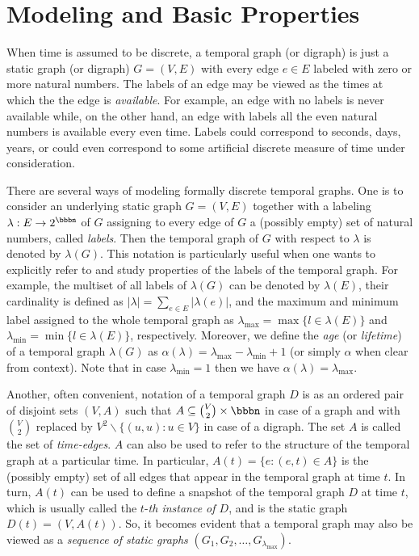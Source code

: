 \documentclass[oribibl, 11pt]{llncs}
\newcommand{\bs}{\backslash}
\begin{document}
\section{Modeling and Basic Properties}
\label{sec:model}

When time is assumed to be discrete, a temporal graph (or digraph) is just a static graph (or digraph) $G=(V,E)$ with every edge $e\in E$ labeled with zero or more natural numbers. The labels of an edge may be viewed as the times at which the the edge is \emph{available}. For example, an edge with no labels is never available while, on the other hand, an edge with labels all the even natural numbers is available every even time. Labels could correspond to seconds, days, years, or could even correspond to some artificial discrete measure of time under consideration. 

There are several ways of modeling formally discrete temporal graphs. One is to consider an underlying static graph $G=(V,E)$ together with a labeling $\lambda:E\rightarrow 2^\bbbn$ of $G$ assigning to every edge of $G$ a (possibly empty) set of natural numbers, called \emph{labels}. Then the temporal graph of $G$ with respect to $\lambda$ is denoted by $\lambda(G)$. This notation is particularly useful when one wants to explicitly refer to and study properties of the labels of the temporal graph. For example, the multiset of all labels of $\lambda(G)$ can be denoted by $\lambda(E)$, their cardinality is defined as $|\lambda|=\sum_{e\in E} |\lambda(e)|$, and the maximum and minimum label assigned to the whole temporal graph as $\lambda_{\max}= \max\{l\in \lambda(E)\}$ and $\lambda_{\min}= \min\{l\in \lambda(E)\}$, respectively. Moreover, we define the \emph{age} (or \emph{lifetime}) of a temporal graph $\lambda(G)$ as $\alpha(\lambda)= \lambda_{\max}-\lambda_{\min}+1$ (or simply $\alpha$ when clear from context). Note that in case $\lambda_{\min}=1$ then we have $\alpha(\lambda)=\lambda_{\max}$.

Another, often convenient, notation of a temporal graph $D$ is as an ordered pair of disjoint sets $(V,A)$ such that $A\subseteq \binom{V}{2}\times\bbbn$ in case of a graph and with $\binom{V}{2}$ replaced by $V^2\bs \{(u,u):u\in V\}$ in case of a digraph. The set $A$ is called the set of \emph{time-edges}. $A$ can also be used to refer to the structure of the temporal graph at a particular time. In particular, $A(t)= \{e: (e,t)\in A\}$ is the (possibly empty) set of all edges that appear in the temporal graph at time $t$. In turn, $A(t)$ can be used to define a snapshot of the temporal graph $D$ at time $t$, which is usually called the $t$-\emph{th instance of $D$}, and is the static graph $D(t)= (V,A(t))$. So, it becomes evident that a temporal graph may also be viewed as a \emph{sequence of static graphs} $(G_1,G_2,\ldots,G_{\lambda_{\max}})$.
\end{document}
